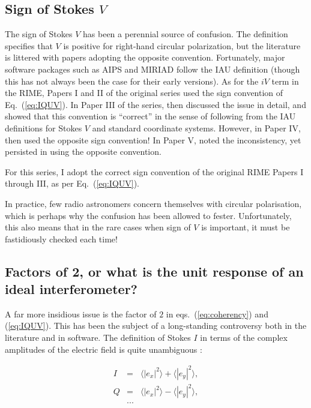 \documentclass[referee]{aa}
\begin{document}
\subsection{Sign of Stokes $V$}

The sign of Stokes $V$ has been a perennial source of confusion. The \citet{IAU74} definition specifies that $V$ is positive for right-hand circular polarization, but the literature is littered with papers adopting the opposite convention. Fortunately, major software packages such as AIPS and MIRIAD follow the IAU definition (though this 
has not always been the case for their early versions). As for the $iV$ term in the RIME, Papers I and II of the original series \citep{ME1,ME2} used the sign convention of Eq.~(\ref{eq:IQUV}). In Paper III of the series, \citet{ME3} then discussed the issue in detail, and showed that this convention is ``correct'' in the sense of following from the IAU definitions for Stokes $V$ and standard coordinate systems. However, in Paper IV, \citet{ME4} then used the opposite sign convention! In Paper V, \citet{ME5} noted the inconsistency, yet persisted in using the opposite convention. 

For this series, I adopt the correct sign convention of the original RIME Papers I through III, as per Eq.~(\ref{eq:IQUV}).

In practice, few radio astronomers concern themselves with circular polarisation, which is perhaps why the confusion has been allowed to fester. Unfortunately, this also means that in the rare cases when sign of $V$ is important, it
must be fastidiously checked each time!

\subsection{\label{sec:factor2}Factors of 2, or what is the unit response of an ideal interferometer?}

A far more insidious issue is the factor of $2$ in eqs.~(\ref{eq:coherency}) and (\ref{eq:IQUV}). This has been the subject of a long-standing controversy both in the literature and in software. The definition of Stokes $I$ in terms of the complex amplitudes of the electric field is quite unambiguous \citep{tms,born-wolf}:

\begin{eqnarray*}
I&=&\langle |e_x|^2\rangle  + \langle |e_y|^2\rangle , \\
Q&=&\langle |e_x|^2\rangle  - \langle |e_y|^2\rangle , \\
&...&
\end{eqnarray*}
\end{document}
